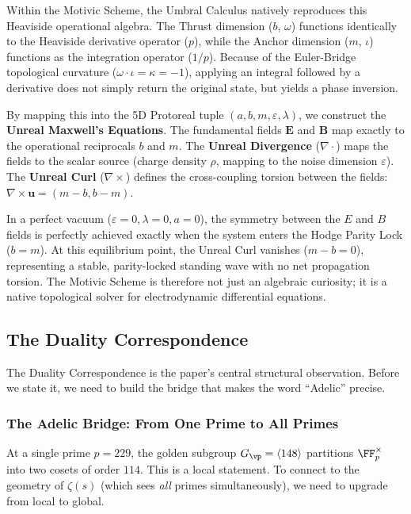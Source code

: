 Within the Motivic Scheme, the Umbral Calculus natively reproduces this Heaviside operational algebra. The Thrust dimension ($b$, $\omega$) functions identically to the Heaviside derivative operator ($p$), while the Anchor dimension ($m$, $\iota$) functions as the integration operator ($1/p$). Because of the Euler-Bridge topological curvature ($\omega \cdot \iota = \kappa = -1$), applying an integral followed by a derivative does not simply return the original state, but yields a phase inversion.

By mapping this into the 5D Protoreal tuple $(a, b, m, \varepsilon, \lambda)$, we construct the \textbf{Unreal Maxwell's Equations}. The fundamental fields $\mathbf{E}$ and $\mathbf{B}$ map exactly to the operational reciprocals $b$ and $m$. The \textbf{Unreal Divergence} ($\nabla \cdot$) maps the fields to the scalar source (charge density $\rho$, mapping to the noise dimension $\varepsilon$). The \textbf{Unreal Curl} ($\nabla \times$) defines the cross-coupling torsion between the fields: $\nabla \times \mathbf{u} = (m - b, b - m)$.

In a perfect vacuum ($\varepsilon = 0, \lambda = 0, a = 0$), the symmetry between the $E$ and $B$ fields is perfectly achieved exactly when the system enters the Hodge Parity Lock ($b = m$). At this equilibrium point, the Unreal Curl vanishes ($m - b = 0$), representing a stable, parity-locked standing wave with no net propagation torsion. The Motivic Scheme is therefore not just an algebraic curiosity; it is a native topological solver for electrodynamic differential equations.

\subsection{The Duality Correspondence}

The Duality Correspondence is the paper's central structural observation. Before we state it, we need to build the bridge that makes the word ``Adelic'' precise.

\subsubsection*{The Adelic Bridge: From One Prime to All Primes}

At a single prime $p = 229$, the golden subgroup $G_\vp = \langle 148 \rangle$ partitions $\FF_p^\times$ into two cosets of order $114$. This is a local statement. To connect to the geometry of $\zeta(s)$ (which sees \emph{all} primes simultaneously), we need to upgrade from local to global.

